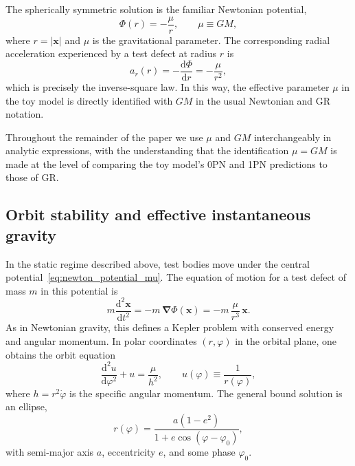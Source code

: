 \documentclass[11pt]{article}
\newcommand{\dd}{\mathrm{d}}
\begin{document}
The spherically symmetric solution is the familiar Newtonian potential,
\begin{equation}
  \Phi(r) = -\frac{\mu}{r},
  \qquad
  \mu \equiv G M,
  \label{eq:newton_potential_mu}
\end{equation}
where $r = |\mathbf{x}|$ and $\mu$ is the gravitational parameter. The corresponding radial acceleration experienced by a test defect at radius $r$ is
\begin{equation}
  a_r(r) = -\frac{\dd \Phi}{\dd r}
          = -\frac{\mu}{r^2},
  \label{eq:newton_accel}
\end{equation}
which is precisely the inverse-square law. In this way, the effective parameter $\mu$ in the toy model is directly identified with $GM$ in the usual Newtonian and GR notation.

Throughout the remainder of the paper we use $\mu$ and $GM$ interchangeably in analytic expressions, with the understanding that the identification $\mu = GM$ is made at the level of comparing the toy model's 0PN and 1PN predictions to those of GR.

\subsection{Orbit stability and effective instantaneous gravity}
\label{sec:orbit_stability}

In the static regime described above, test bodies move under the central potential~\eqref{eq:newton_potential_mu}. The equation of motion for a test defect of mass $m$ in this potential is
\begin{equation}
  m \frac{\dd^2 \mathbf{x}}{\dd t^2} = -m\,\bm{\nabla} \Phi(\mathbf{x})
  = -m\,\frac{\mu}{r^3}\,\mathbf{x}.
\end{equation}
As in Newtonian gravity, this defines a Kepler problem with conserved energy and angular momentum. In polar coordinates $(r,\varphi)$ in the orbital plane, one obtains the orbit equation
\begin{equation}
  \frac{\dd^2 u}{\dd \varphi^2} + u = \frac{\mu}{h^2},
  \qquad
  u(\varphi) \equiv \frac{1}{r(\varphi)},
\end{equation}
where $h = r^2 \dot{\varphi}$ is the specific angular momentum. The general bound solution is an ellipse,
\begin{equation}
  r(\varphi) = \frac{a(1-e^2)}{1 + e \cos(\varphi - \varphi_0)},
\end{equation}
with semi-major axis $a$, eccentricity $e$, and some phase $\varphi_0$.
\end{document}
